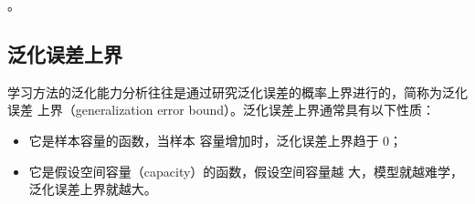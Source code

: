 。
\subsection{泛化误差上界}
学习方法的泛化能力分析往往是通过研究泛化误差的概率上界进行的，简称为泛化误差
上界（generalization error bound）。泛化误差上界通常具有以下性质：
\begin{itemize}
    \item 它是样本容量的函数，当样本
          容量增加时，泛化误差上界趋于 0；
    \item 它是假设空间容量（capacity）的函数，假设空间容量越
          大，模型就越难学，泛化误差上界就越大。
\end{itemize}